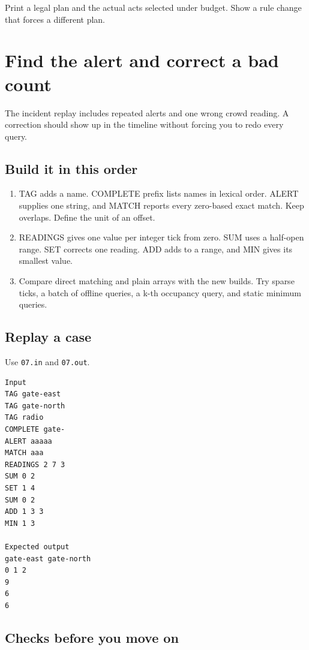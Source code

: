 \documentclass[11pt,letterpaper]{article}
\begin{document}
Print a legal plan and the actual acts selected under budget. Show a rule change that forces a different plan.

\clearpage

\section{Find the alert and correct a bad count}\label{festival:07}

The incident replay includes repeated alerts and one wrong crowd reading. A correction should show up in the timeline without forcing you to redo every query.

\subsection*{Build it in this order}

\begin{enumerate}
\item TAG adds a name. COMPLETE prefix lists names in lexical order. ALERT supplies one string, and MATCH reports every zero-based exact match. Keep overlaps. Define the unit of an offset.
\item READINGS gives one value per integer tick from zero. SUM uses a half-open range. SET corrects one reading. ADD adds to a range, and MIN gives its smallest value.
\item Compare direct matching and plain arrays with the new builds. Try sparse ticks, a batch of offline queries, a k-th occupancy query, and static minimum queries.
\end{enumerate}

\subsection*{Replay a case}

Use \texttt{07.in} and \texttt{07.out}.

\begin{samepage}
\small
\begin{verbatim}
Input
TAG gate-east
TAG gate-north
TAG radio
COMPLETE gate-
ALERT aaaaa
MATCH aaa
READINGS 2 7 3
SUM 0 2
SET 1 4
SUM 0 2
ADD 1 3 3
MIN 1 3

Expected output
gate-east gate-north
0 1 2
9
6
6
\end{verbatim}
\end{samepage}

\subsection*{Checks before you move on}
\end{document}
